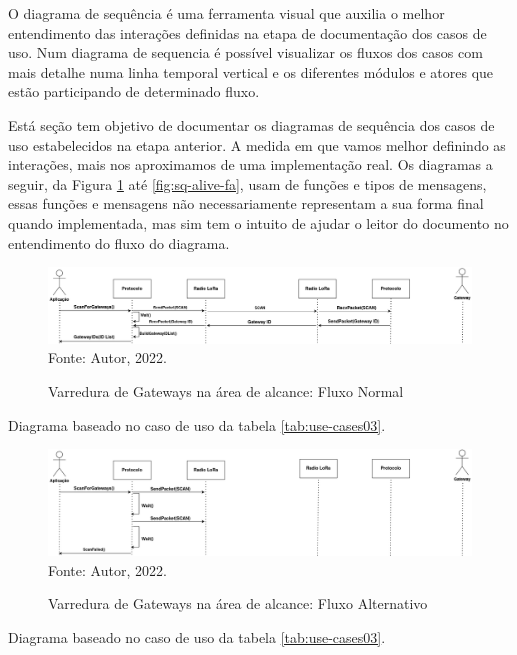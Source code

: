 O diagrama de sequência é uma ferramenta visual que auxilia o melhor entendimento
das interações definidas na etapa de documentação dos casos de uso. Num diagrama
de sequencia é possível visualizar os fluxos dos casos com mais detalhe numa linha
temporal vertical e os diferentes módulos e atores que estão participando de determinado
fluxo. \newline

Está seção tem objetivo de documentar os diagramas de sequência dos casos de uso estabelecidos
na etapa anterior. A medida em que vamos melhor definindo as interações, mais nos aproximamos
de uma implementação real. Os diagramas a seguir, da Figura \ref{fig:sq-scan} até
\ref{fig:sq-alive-fa}, usam de funções e tipos de mensagens, essas funções e mensagens não
necessariamente representam a sua forma final quando implementada, mas sim tem o intuito
de ajudar o leitor do documento no entendimento do fluxo do diagrama.

\begin{figure}[htp]
    \centering
	\caption{Varredura de Gateways na área de alcance: Fluxo Normal}
    \includegraphics[width=\textwidth,height=0.14\textheight]{img/scan.drawio.png}
    \label{fig:sq-scan}
    Fonte: Autor, 2022.
\end{figure}

Diagrama baseado no caso de uso da tabela \ref{tab:use-cases03}.
\newpage

\begin{figure}[htp]
    \centering
	\caption{Varredura de Gateways na área de alcance: Fluxo Alternativo}
    \includegraphics[width=\textwidth,height=0.17\textheight]{img/scan-fa.drawio.png}
    \label{fig:sq-scan-fa}
    Fonte: Autor, 2022.
\end{figure}

Diagrama baseado no caso de uso da tabela \ref{tab:use-cases03}.

